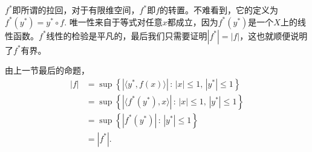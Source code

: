 $f^*$即所谓的拉回，对于有限维空间，$f^*$即$f$的转置。不难看到，它的定义为$f^*(y^*)=y^*\circ f$. 唯一性来自于等式对任意$x$都成立，因为$f^*(y^*)$是一个$X$上的线性函数。$f^*$线性的检验是平凡的，最后我们只需要证明$|f^*|=|f|$，这也就顺便说明了$f^*$有界。

由上一节最后的命题，
\begin{align*}
|f|&=\sup \left\{|\langle y^*,f(x)\rangle |\,:\, |x|\leq 1,\, |y^*|\leq 1\right\}\\
&=\sup \left\{|\langle f^*(y^*),x\rangle |\,:\, |x|\leq 1,\, |y^*|\leq 1\right\}\\
&=\sup \left\{|f^*(y^*)|\,:\, |y^*|\leq 1\right\}\\
&=|f^*|.
\end{align*}
